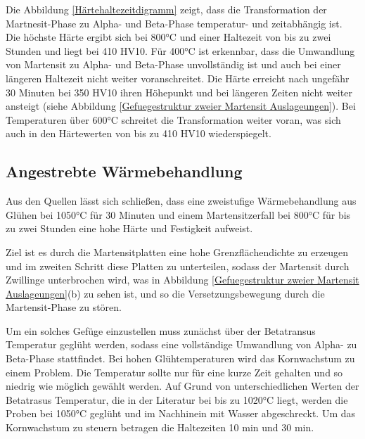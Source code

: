 \documentclass[a4paper, 11pt]{tubsreprt}
\begin{document}
Die Abbildung \ref{Härtehaltezeitdigramm} zeigt, dass die Transformation der Martnesit-Phase zu Alpha- und Beta-Phase temperatur- und zeitabhängig ist. Die höchste Härte ergibt sich bei 800°C und einer Haltezeit von bis zu zwei Stunden und liegt bei 410 HV10. Für 400°C ist erkennbar, dass die Umwandlung von Martensit zu Alpha- und Beta-Phase unvollständig ist und auch bei einer längeren Haltezeit nicht weiter voranschreitet. Die Härte erreicht nach ungefähr 30 Minuten bei 350 HV10 ihren Höhepunkt und bei längeren Zeiten nicht weiter ansteigt (siehe Abbildung \ref{Gefuegestruktur zweier Martensit Auslageungen}). Bei Temperaturen über 600°C schreitet die Transformation weiter voran, was sich auch in den Härtewerten von bis zu 410 HV10 wiederspiegelt. 
\newpage
\subsection{Angestrebte Wärmebehandlung}
Aus den Quellen lässt sich schließen, dass eine zweistufige Wärmebehandlung aus Glühen bei 1050°C für 30 Minuten und einem Martensitzerfall bei 800°C für bis zu zwei Stunden eine hohe Härte und Festigkeit aufweist.

Ziel ist es durch die Martensitplatten eine hohe Grenzflächendichte zu erzeugen und im zweiten Schritt diese Platten zu unterteilen, sodass der Martensit durch Zwillinge unterbrochen wird, was in Abbildung \ref{Gefuegestruktur zweier Martensit Auslageungen}(b) zu sehen ist, und so die Versetzungsbewegung durch die Martensit-Phase zu stören.

Um ein solches Gefüge einzustellen muss zunächst über der Betatransus Temperatur geglüht werden, sodass eine vollständige Umwandlung von Alpha- zu Beta-Phase stattfindet. Bei hohen Glühtemperaturen wird das Kornwachstum zu einem Problem. Die Temperatur sollte nur für eine kurze Zeit gehalten und so niedrig wie möglich gewählt werden. Auf Grund von unterschiedlichen Werten der Betatrasus Temperatur, die in der Literatur bei bis zu 1020°C liegt\cite{Tarin1995}, werden die Proben bei 1050°C geglüht und im Nachhinein mit Wasser abgeschreckt. Um das Kornwachstum zu steuern betragen die Haltezeiten 10 min und 30 min. 
\end{document}
